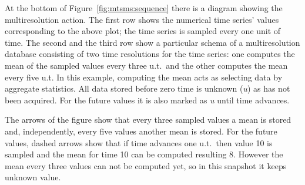 At the bottom of Figure~\ref{fig:mtsms:sequence} there is a diagram
showing the multiresolution action. The first row shows the numerical
time series' values corresponding to the above plot; the time series
is sampled every one unit of time. The second and the third row show a
particular schema of a multiresolution database consisting of two time
resolutions for the time series: one computes the mean of the sampled
values every three u.t.\ and the other computes the mean every five
u.t. In this example, computing the mean acts as selecting data
by aggregate statistics. All data stored before zero time is unknown
(\emph{u}) as has not been acquired. For the future values it is also
marked as \emph{u} until time advances.

The arrows of the figure show that every three sampled values a mean
is stored and, independently, every five values another mean is
stored. For the future values, dashed arrows show that if time
advances one u.t.\ then value 10 is sampled and the mean for time 10
can be computed resulting 8. However the mean every three values can not
be computed yet, so in this snapshot it keeps unknown value.






